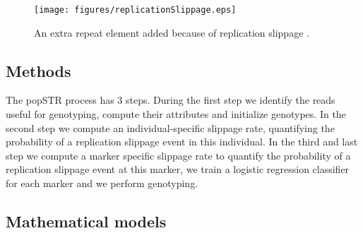 \documentclass{bioinfo}
\begin{document}
\begin{figure}[ht]
\centering
 \texttt{[image: figures/replicationSlippage.eps]}
  \caption[Replication Slippage]{An extra repeat element added because of replication slippage \cite{Brown2002}.}
 \label{fig:RepSlipp}
\end{figure}




\begin{methods}
\section{Methods}

The popSTR process has 3 steps. During the first step we identify the reads useful for genotyping, compute their attributes and initialize genotypes. In the second step we compute an individual-specific slippage rate, quantifying the probability of a replication slippage event in this individual. In the third and last step we compute a marker specific slippage rate to quantify the probability of a replication slippage event at this marker, we train a logistic regression classifier for each marker and we perform genotyping.
\enlargethispage{6pt}
\subsection{Mathematical models}

\end{methods}
\end{document}
